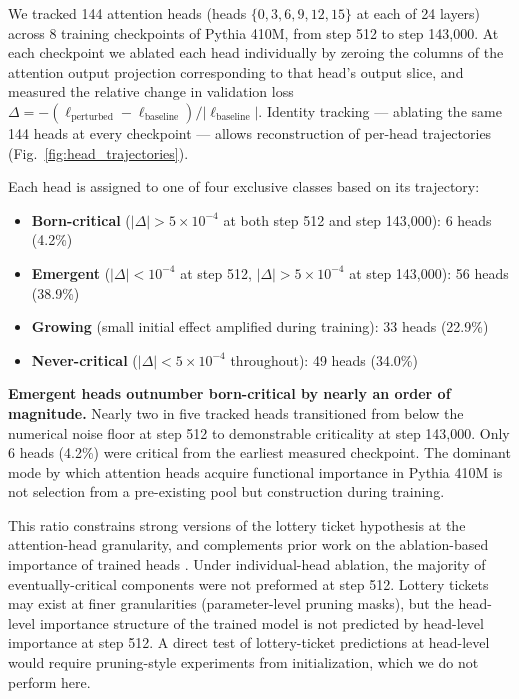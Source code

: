 \documentclass{article}
\begin{document}
We tracked 144 attention heads (heads $\{0, 3, 6, 9, 12, 15\}$ at each of 24 layers) across 8 training checkpoints of Pythia 410M, from step 512 to step 143,000. At each checkpoint we ablated each head individually by zeroing the columns of the attention output projection corresponding to that head's output slice, and measured the relative change in validation loss $\Delta = -(\ell_\text{perturbed} - \ell_\text{baseline}) / |\ell_\text{baseline}|$. Identity tracking --- ablating the same 144 heads at every checkpoint --- allows reconstruction of per-head trajectories (Fig.~\ref{fig:head_trajectories}).

Each head is assigned to one of four exclusive classes based on its trajectory:

\begin{itemize}
    \item \textbf{Born-critical} ($|\Delta| > 5 \times 10^{-4}$ at both step 512 and step 143,000): 6 heads (4.2\%)
    \item \textbf{Emergent} ($|\Delta| < 10^{-4}$ at step 512, $|\Delta| > 5 \times 10^{-4}$ at step 143,000): 56 heads (38.9\%)
    \item \textbf{Growing} (small initial effect amplified during training): 33 heads (22.9\%)
    \item \textbf{Never-critical} ($|\Delta| < 5 \times 10^{-4}$ throughout): 49 heads (34.0\%)
\end{itemize}

\textbf{Emergent heads outnumber born-critical by nearly an order of magnitude.} Nearly two in five tracked heads transitioned from below the numerical noise floor at step 512 to demonstrable criticality at step 143,000. Only 6 heads (4.2\%) were critical from the earliest measured checkpoint. The dominant mode by which attention heads acquire functional importance in Pythia 410M is not selection from a pre-existing pool but construction during training.

This ratio constrains strong versions of the lottery ticket hypothesis \citep{frankle2019lottery} at the attention-head granularity, and complements prior work on the ablation-based importance of trained heads \citep{michel2019sixteen}. Under individual-head ablation, the majority of eventually-critical components were not preformed at step 512. Lottery tickets may exist at finer granularities (parameter-level pruning masks), but the head-level importance structure of the trained model is not predicted by head-level importance at step 512. A direct test of lottery-ticket predictions at head-level would require pruning-style experiments from initialization, which we do not perform here.
\end{document}

